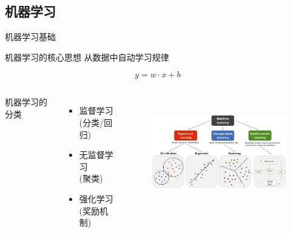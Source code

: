 \subsection{机器学习}
\begin{frame}{机器学习基础}
  \begin{block}{机器学习的核心思想}
    从数据中自动学习规律
  \end{block}

  \begin{example}
    \begin{equation*}
      y = w \cdot x + b
    \end{equation*}
  \end{example}
  \begin{columns}
机器学习的分类
  \begin{itemize}
    \item 监督学习\\(分类/回归)
    \item 无监督学习\\(聚类)
    \item 强化学习\\(奖励机制)
  \end{itemize}
\begin{figure}[h!]
\vspace*{-0.45in}
\centering
   \includegraphics[height=1.6in, width=2.9in, viewport=0 0 210 120,clip]{Figures/The_main-types-of-machine-learning.png}
\label{Machine-Learning-types}
\end{figure}
  \end{columns}
\end{frame}


